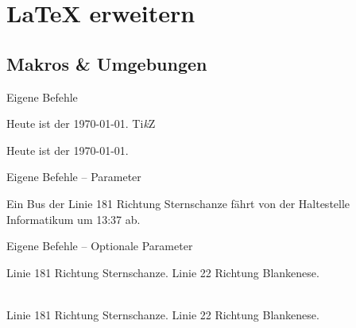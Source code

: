 \documentclass{beamer}
\begin{document}

	\section{\LaTeX{} erweitern}
		\sectionTitleFrame
	
		\subsection{Makros \& Umgebungen}
		
		\begin{frame}[containsverbatim]{Eigene Befehle}
			\begin{latexcode}
\def\heute{Heute ist der \today.}
\newcommand{\heute}{Heute ist der \today.}
\newcommand{\TikZ}{Ti\textit{k}Z}
\heute
\TikZ
			\end{latexcode}
			Heute ist der \today.\\
			\TikZ
		\end{frame}


		\begin{frame}[containsverbatim]{Eigene Befehle -- Parameter}
			\begin{latexcode}
\newcommand{\bus}[4]{Ein Bus der Linie #1 Richtung
                    #2 fährt von der Haltestelle
                    #3 um #4 ab.}
\bus{181}{Sternschanze}{Informatikum}{13:37}
			\end{latexcode}
		\end{frame}
		
		
		\begin{frame}[containsverbatim]{Eigene Befehle -- Optionale Parameter}
		\begin{latexcode}
			\newcommand{\bus}[2][181]{Linie #1 Richtung #2.}
			\bus{Sternschanze}
			\bus[22]{Blankenese}
		\end{latexcode}
		\\
		\vspace{0.2cm}
		Linie 181 Richtung Sternschanze.
		Linie 22 Richtung Blankenese.
		\end{frame}
\end{document}
